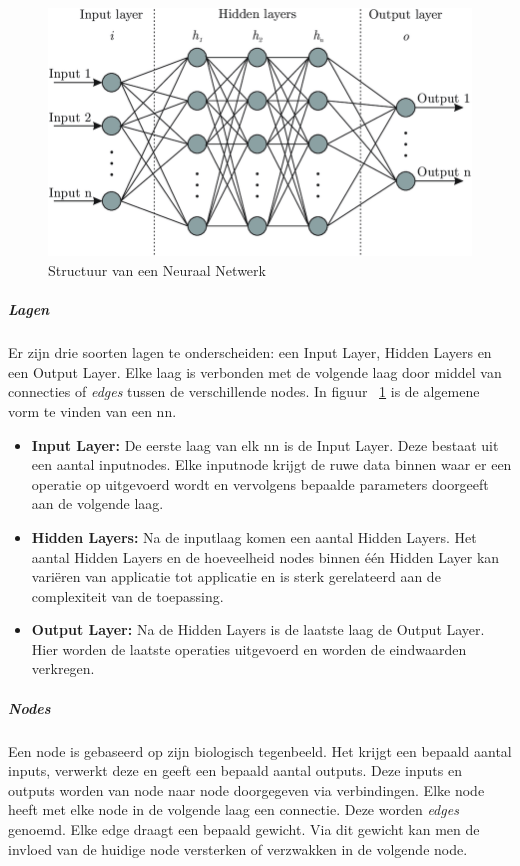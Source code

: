 		\begin{figure}
			\centering
			\includegraphics[width=140mm]{afbeeldingen/neuralNetwork2.PNG}
			\caption{Structuur van een Neuraal Netwerk}
			\label{fig:neuralNetworkStructuur}
		\end{figure}
		
			\subparagraph{Lagen}
			Er zijn drie soorten lagen te onderscheiden: een Input Layer, Hidden Layers en een Output Layer. Elke laag is verbonden met de volgende laag door middel van connecties of \textit{edges} tussen de verschillende nodes. In figuur ~\ref{fig:neuralNetworkStructuur} is de algemene vorm te vinden van een \gls{nn}.
		
				\begin{itemize}
					\item \textbf{Input Layer:} De eerste laag van elk \gls{nn} is de Input Layer. Deze bestaat uit een aantal inputnodes. Elke inputnode krijgt de ruwe data binnen waar er een operatie op uitgevoerd wordt en vervolgens bepaalde parameters doorgeeft aan de volgende laag. 
					\item \textbf{Hidden Layers:}  Na de inputlaag komen een aantal Hidden Layers. Het aantal Hidden Layers en de hoeveelheid nodes binnen \'e\'en Hidden Layer kan vari\"eren van applicatie tot applicatie en is sterk gerelateerd aan de complexiteit van de toepassing.
					\item \textbf{Output Layer:} Na de Hidden Layers is de laatste laag de Output Layer. Hier worden de laatste operaties uitgevoerd en worden de eindwaarden verkregen.
				\end{itemize}
			
			\subparagraph{Nodes}
			Een node is gebaseerd op zijn biologisch tegenbeeld. Het krijgt een bepaald aantal inputs, verwerkt deze en geeft een bepaald aantal outputs. Deze inputs en outputs worden van node naar node doorgegeven via verbindingen. Elke node heeft met elke node in de volgende laag een connectie. Deze worden \textit{edges} genoemd. Elke edge draagt een bepaald gewicht. Via dit gewicht kan men de invloed van de  huidige node versterken of verzwakken in de volgende node.
	
